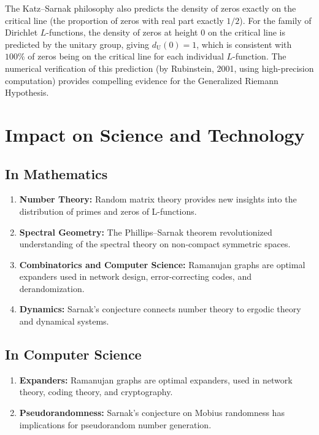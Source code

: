 The Katz--Sarnak philosophy also predicts the density of zeros exactly on the critical line (the proportion of zeros with real part exactly $1/2$). For the family of Dirichlet $L$-functions, the density of zeros at height $0$ on the critical line is predicted by the unitary group, giving $d_{\operatorname{U}}(0) = 1$, which is consistent with $100\%$ of zeros being on the critical line for each individual $L$-function. The numerical verification of this prediction (by Rubinstein, 2001, using high-precision computation) provides compelling evidence for the Generalized Riemann Hypothesis.

\section{Impact on Science and Technology}

\subsection{In Mathematics}

\begin{enumerate}
    \item \textbf{Number Theory:} Random matrix theory provides new insights into the distribution of primes and zeros of L-functions.
    \item \textbf{Spectral Geometry:} The Phillips--Sarnak theorem revolutionized understanding of the spectral theory on non-compact symmetric spaces.
    \item \textbf{Combinatorics and Computer Science:} Ramanujan graphs are optimal expanders used in network design, error-correcting codes, and derandomization.
    \item \textbf{Dynamics:} Sarnak's conjecture connects number theory to ergodic theory and dynamical systems.
\end{enumerate}

\subsection{In Computer Science}

\begin{enumerate}
    \item \textbf{Expanders:} Ramanujan graphs are optimal expanders, used in network theory, coding theory, and cryptography.
    \item \textbf{Pseudorandomness:} Sarnak's conjecture on Mobius randomness has implications for pseudorandom number generation.
\end{enumerate}

